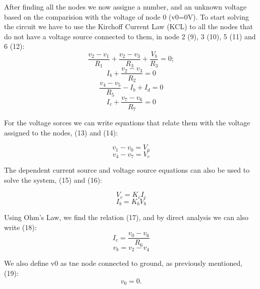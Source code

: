 After finding all the nodes we now assigne a number, and an unknown voltage based on the comparision with the voltage of node 0 (v0=0V). To start solving the circuit we have to use the Kirchoff Current Law (KCL) to all the nodes that do not have a voltage source connected to them, in node 2 (9), 3 (10), 5 (11) and 6 (12):
\begin{equation}
  \frac{v_2-v_1}{R_1} + \frac{v_2-v_3}{R_3} + \frac{V_b}{R_3} = 0;
  \label{eq:Node2}
\end{equation}
\begin{equation}
  I_b + \frac{v_2-v_3}{R_2} = 0	
  \label{eq:Node3}
\end{equation}
\begin{equation}
  \frac{v_4-v_5}{R_5} - I_b + I_d = 0
  \label{eq:Node5}
\end{equation}
\begin{equation}
  I_c + \frac{v_7-v_6}{R_7} = 0
  \label{eq:Node6}
\end{equation}

For the voltage sorces we can write equations that relate them with the voltage assigned to the nodes, (13) and (14):

\begin{equation}
  v_1 - v_0 = V_a
  \label{eq:N_Va}
\end{equation}
\begin{equation}
  v_4 - v_7 = V_c
  \label{eq:N_Vc}
\end{equation}

The dependent current source and voltage source equations can also be used to solve the system, (15) and (16):

\begin{equation}
  V_c = K_cI_c
  \label{eq:VcIc}
\end{equation}
\begin{equation}
  I_b = K_bV_b
  \label{eq:IbVb}
\end{equation}


Using Ohm’s Law, we find the relation (17), and by direct analysis we can also write (18):
\begin{equation}
  I_c = \frac{v_0-v_6}{R_6}
  \label{eq:Ic}
\end{equation}
\begin{equation}
  v_b = v_2 - v_4
  \label{eq:Vb}
\end{equation}

We also define v0 as tne node connected to ground, as previously mentioned, (19):
\begin{equation}
  v_0 = 0.
  \label{eq:v0}
\end{equation}

